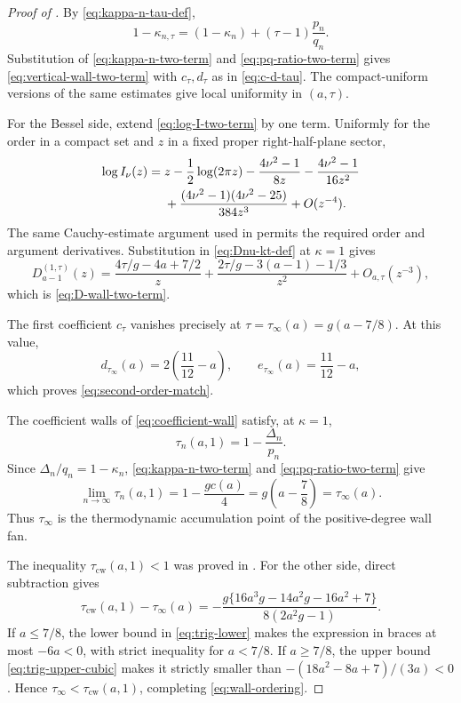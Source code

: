 \documentclass[11pt,a4paper]{amsart}
\numberwithin{equation}{section}
\theoremstyle{plain}
\theoremstyle{definition}
\begin{document}
\begin{proof}[Proof of ]
By \eqref{eq:kappa-n-tau-def},
\[
 1-\kappa_{n,\tau}
 =(1-\kappa_n)+(\tau-1)\frac{p_n}{q_n}.
\]
Substitution of \eqref{eq:kappa-n-two-term} and
\eqref{eq:pq-ratio-two-term} gives
\eqref{eq:vertical-wall-two-term} with \(c_\tau,d_\tau\) as in
\eqref{eq:c-d-tau}.  The compact-uniform versions of the same estimates give
local uniformity in \((a,\tau)\).

For the Bessel side, extend \eqref{eq:log-I-two-term} by one term.  Uniformly
for the order in a compact set and \(z\) in a fixed proper right-half-plane
sector,
\begin{align}\label{eq:log-I-three-term}
 \log I_\nu(z)={}&z-\frac12\log(2\pi z)
 -\frac{4\nu^2-1}{8z}
 -\frac{4\nu^2-1}{16z^2}\notag\\
 &+\frac{(4\nu^2-1)(4\nu^2-25)}{384z^3}
 +O(z^{-4}).
\end{align}
The same Cauchy-estimate argument used in 
permits the required order and argument derivatives.  Substitution in
\eqref{eq:Dnu-kt-def} at \(\kappa=1\) gives
\[
 D_{a-1}^{(1,\tau)}(z)
 =\frac{4\tau/g-4a+7/2}{z}
 +\frac{2\tau/g-3(a-1)-1/3}{z^2}
 +O_{a,\tau}(z^{-3}),
\]
which is \eqref{eq:D-wall-two-term}.

The first coefficient \(c_\tau\) vanishes precisely at
\(\tau=\tau_\infty(a)=g(a-7/8)\).  At this value,
\[
 d_{\tau_\infty}(a)=2\left(\frac{11}{12}-a\right),
 \qquad
 e_{\tau_\infty}(a)=\frac{11}{12}-a,
\]
which proves \eqref{eq:second-order-match}.

The coefficient walls of \eqref{eq:coefficient-wall} satisfy, at \(\kappa=1\),
\[
 \tau_n(a,1)=1-\frac{\Delta_n}{p_n}.
\]
Since \(\Delta_n/q_n=1-\kappa_n\),
\eqref{eq:kappa-n-two-term} and \eqref{eq:pq-ratio-two-term} give
\begin{equation}\label{eq:tau-n-limit}
 \lim_{n\to\infty}\tau_n(a,1)
 =1-\frac{gc(a)}4
 =g\left(a-\frac78\right)
 =\tau_\infty(a).
\end{equation}
Thus \(\tau_\infty\) is the thermodynamic accumulation point of the
positive-degree wall fan.

The inequality \(\tau_{\mathrm{cw}}(a,1)<1\) was proved in
.  For the other side, direct subtraction gives
\[
 \tau_{\mathrm{cw}}(a,1)-\tau_\infty(a)
 =-\frac{g\{16a^3g-14a^2g-16a^2+7\}}
 {8(2a^2g-1)}.
\]
If \(a\le7/8\), the lower bound in \eqref{eq:trig-lower} makes the expression
in braces at most \(-6a<0\), with strict inequality for \(a<7/8\).  If \(a\ge7/8\), the upper bound
\eqref{eq:trig-upper-cubic} makes it strictly smaller than
\(-(18a^2-8a+7)/(3a)<0\).
Hence \(\tau_\infty<\tau_{\mathrm{cw}}(a,1)\), completing
\eqref{eq:wall-ordering}.
\end{proof}
\end{document}
